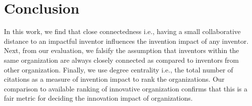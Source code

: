 \section{Conclusion}
In this work, we find that close connectedness i.e., having a small collaborative distance
 to an impactful inventor  influences the
invention impact of any inventor. Next, from our evaluation, we falsify the assumption that 
 inventors within the same organization are always closely connected as compared to
inventors from other organization. Finally, we use degree centrality i.e., the total number of citations 
as a measure of invention impact to rank the organizations. Our comparison to
available ranking of innovative organization confirms that 
this is a fair metric for deciding the innovation impact of organizations.

